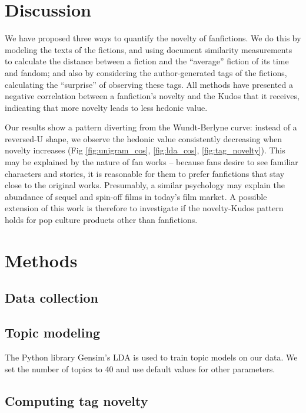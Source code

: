 \documentclass[a4paper]{article}
\begin{document}
\section*{Discussion}
We have proposed three ways to quantify the novelty of fanfictions. We do this by modeling the texts of the fictions, and using document similarity measurements to calculate the distance between a fiction and the ``average'' fiction of its time and fandom; and also by considering the author-generated tags of the fictions, calculating the ``surprise'' of observing these tags. All methods have presented a negative correlation between a fanfiction's novelty and the Kudos that it receives, indicating that more novelty leads to less hedonic value.

Our results show a pattern diverting from the Wundt-Berlyne curve: instead of a reversed-U shape, we observe the hedonic value consistently decreasing when novelty increases (Fig \ref{fig:unigram_cos}, \ref{fig:lda_cos}, \ref{fig:tag_novelty}). This may be explained by the nature of fan works -- because fans desire to see familiar characters and stories, it is reasonable for them to prefer fanfictions that stay close to the original works. Presumably, a similar psychology may explain the abundance of sequel and spin-off films in today's film market. A possible extension of this work is therefore to investigate if the novelty-Kudos pattern holds for pop culture products other than fanfictions. 


\section*{Methods}

\subsection*{Data collection}


\subsection*{Topic modeling}
The Python library Gensim's LDA \cite{gensimlda} is used to train topic models on our data. We set the number of topics to 40 and use default values for other parameters. 
\subsection*{Computing tag novelty}






    
\end{document}
